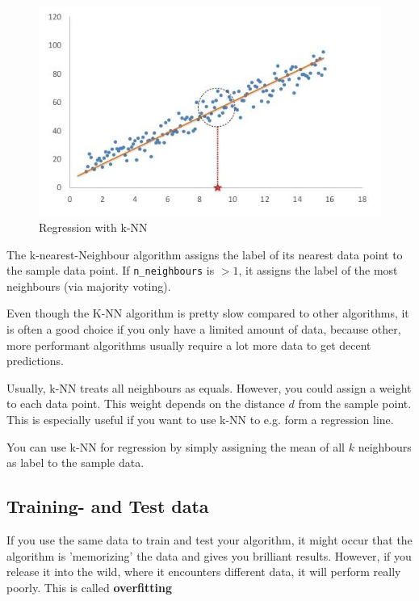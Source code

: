\documentclass[11pt]{article}
\newcommand{\code}[1]{\texttt{#1}}
\begin{document}
\vspace{10px}

\begin{figure}
    \centering
    \includegraphics[keepaspectratio=true,height=10\baselineskip]{k-nn-regression.jpg}
    \caption{Regression with k-NN}
    \label{fig:knn-regression}
\end{figure}

The k-nearest-Neighbour algorithm assigns the label of its nearest data point to the sample data point. If \code{n\_neighbours} is $>1$, it assigns the label of the most neighbours (via majority voting).

\vspace{10px}

Even though the K-NN algorithm is pretty slow compared to other algorithms, it is often a good choice if you only have a limited amount of data, because other, more performant algorithms usually require a lot more data to get decent predictions.

Usually, k-NN treats all neighbours as equals. However, you could assign a weight to each data point. This weight depends on the distance $d$ from the sample point. This is especially useful if you want to use k-NN to e.g. form a regression line.

You can use k-NN for regression by simply assigning the mean of all $k$ neighbours as label to the sample data.

\subsection{Training- and Test data}
If you use the same data to train and test your algorithm, it might occur that the algorithm is 'memorizing' the data and gives you brilliant results. However, if you release it into the wild, where it encounters different data, it will perform really poorly. This is called \textbf{overfitting}
\end{document}
